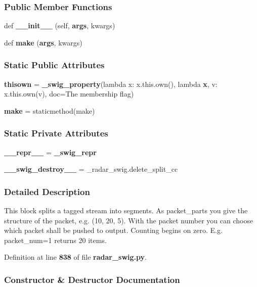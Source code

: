 \subsubsection*{Public Member Functions}
\begin{DoxyCompactItemize}
\item 
def {\bf \+\_\+\+\_\+init\+\_\+\+\_\+} (self, {\bf args}, kwargs)
\item 
def {\bf make} ({\bf args}, kwargs)
\end{DoxyCompactItemize}
\subsubsection*{Static Public Attributes}
\begin{DoxyCompactItemize}
\item 
{\bf thisown} = {\bf \+\_\+swig\+\_\+property}(lambda x\+: x.\+this.\+own(), lambda {\bf x}, v\+: x.\+this.\+own(v), doc=\textquotesingle{}The membership flag\textquotesingle{})
\item 
{\bf make} = staticmethod(make)
\end{DoxyCompactItemize}
\subsubsection*{Static Private Attributes}
\begin{DoxyCompactItemize}
\item 
{\bf \+\_\+\+\_\+repr\+\_\+\+\_\+} = {\bf \+\_\+swig\+\_\+repr}
\item 
{\bf \+\_\+\+\_\+swig\+\_\+destroy\+\_\+\+\_\+} = \+\_\+radar\+\_\+swig.\+delete\+\_\+split\+\_\+cc
\end{DoxyCompactItemize}


\subsubsection{Detailed Description}
\begin{DoxyVerb}This block splits a tagged stream into segments. As packet_parts you give the structure of the packet, e.g. (10, 20, 5). With the packet number you can choose which packet shall be pushed to output. Counting begins on zero. E.g. packet_num=1 returns 20 items.\end{DoxyVerb}
 

Definition at line {\bf 838} of file {\bf radar\+\_\+swig.\+py}.



\subsubsection{Constructor \& Destructor Documentation}
